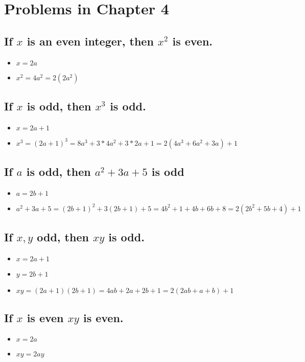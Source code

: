 \documentclass[11pt, oneside]{amsart}
\author{Francisco J. Blanco-Silva}
\date{\today}
\title{}
\begin{document}
\section{Problems in Chapter 4}
\label{sec:orgbb03820}
\subsection{If \(x\) is an even integer, then \(x^2\) is even.}
\label{sec:org4eea571}
\begin{itemize}
\item \(x = 2a\)
\item \(x^2= 4a^2 = 2(2a^2)\)
\end{itemize}

\subsection{If \(x\) is odd, then \(x^3\) is odd.}
\label{sec:org6baf8c2}
\begin{itemize}
\item \(x=2a+1\)
\item \(x^3 = (2a+1)^3 = 8a^3 + 3*4a^2 + 3*2a + 1 = 2(4a^3+6a^2+3a)+1\)
\end{itemize}

\subsection{If \(a\) is odd, then \(a^2+3a+5\) is odd}
\label{sec:orgb363384}
\begin{itemize}
\item \(a=2b+1\)
\item \(a^2+3a+5 = (2b+1)^2 + 3(2b+1) + 5 = 4b^2+1+4b+6b+8 = 2(2b^2+5b+4)+1\)
\end{itemize}

\subsection{If \(x,y\) odd, then \(xy\) is odd.}
\label{sec:orgdd2148b}
\begin{itemize}
\item \(x=2a+1\)
\item \(y=2b+1\)
\item \(xy=(2a+1)(2b+1)=4ab+2a+2b+1 = 2(2ab+a+b)+1\)
\end{itemize}

\subsection{If \(x\) is even \(xy\) is even.}
\label{sec:org6511be8}
\begin{itemize}
\item \(x=2a\)
\item \(xy=2ay\)
\end{itemize}
\end{document}
